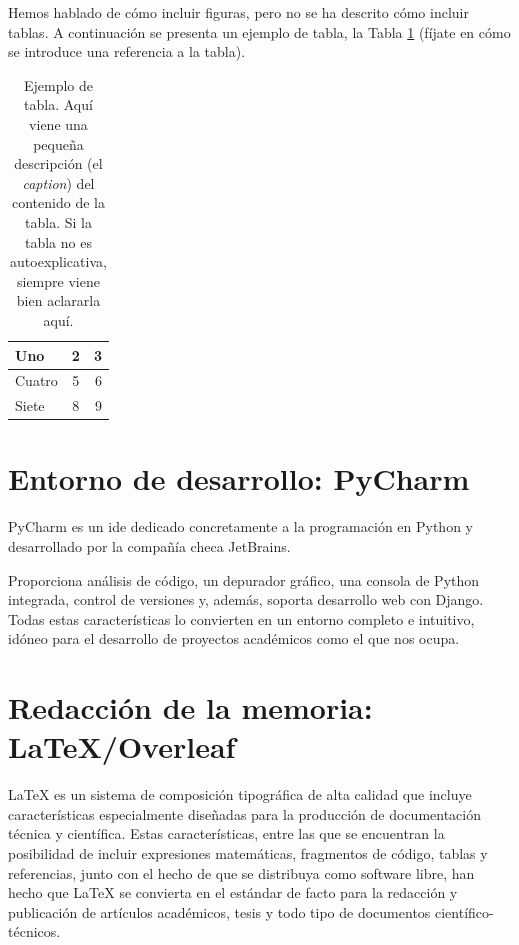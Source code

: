 \documentclass[a4paper, 12pt]{book}
\begin{document}
Hemos hablado de cómo incluir figuras, pero no se ha descrito cómo incluir tablas.
A continuación se presenta un ejemplo de tabla, la Tabla \ref{tabla:ejemplo} (fíjate 
en cómo se introduce una referencia a la tabla).

\begin{table}
 \begin{center}
  \begin{tabular}{ | l | c | r |} %
    \hline
    Uno & 2 & 3 \\ \hline %
    Cuatro & 5 & 6 \\ \hline
    Siete & 8 & 9 \\
    \hline
  \end{tabular}
  \caption{Ejemplo de tabla. Aquí viene una pequeña descripción (el \emph{caption}) del contenido de la tabla. Si la tabla no es autoexplicativa, siempre viene bien aclararla aquí.}
  \label{tabla:ejemplo}
 \end{center}
\end{table}

\section{Entorno de desarrollo: PyCharm}
\label{sec:entorno_de_desarrollo}


PyCharm es un \gls{ide} dedicado concretamente a la programación en Python y desarrollado por la compañía checa JetBrains.

Proporciona análisis de código, un depurador gráfico, una consola de Python integrada, control de versiones y, además, soporta desarrollo web con Django. Todas estas características lo convierten en un entorno completo e intuitivo, idóneo para el desarrollo de proyectos académicos como el que nos ocupa.


\section{Redacción de la memoria: LaTeX/Overleaf}
\label{sec:redaccion_de_la_memoria}

LaTeX es un sistema de composición tipográfica de alta calidad que incluye características especialmente diseñadas para la producción de documentación técnica y científica. Estas características, entre las que se encuentran la posibilidad de incluir expresiones matemáticas, fragmentos de código, tablas y referencias, junto con el hecho de que se distribuya como software libre, han hecho que LaTeX se convierta en el estándar de facto para la redacción y publicación de artículos académicos, tesis y todo tipo de documentos científico-técnicos. 
\end{document}
